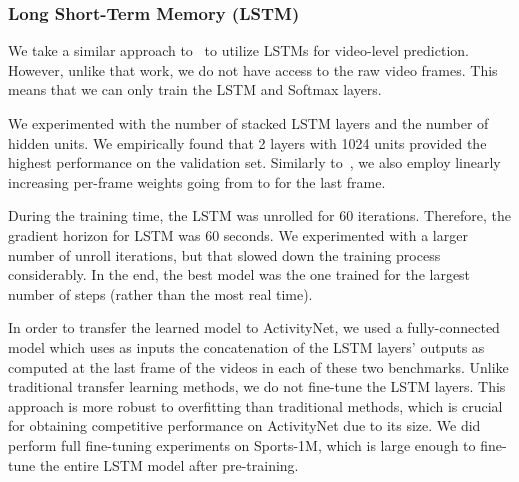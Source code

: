 \documentclass{sig-alternate-05-2015}
\begin{document}
\subsubsection{Long Short-Term Memory (LSTM)}
\label{sec:lstm}
We take a similar approach to~\cite{beyond} to utilize LSTMs for video-level prediction. However, unlike that work, we do not have access to the raw video frames. This means that we can only train the LSTM and Softmax layers.

  We experimented with the number of stacked LSTM layers and the number of hidden units. We empirically found that 2 layers with 1024 units provided the highest performance on the validation set. Similarly to~\cite{beyond}, we also employ linearly increasing per-frame weights going from  to  for the last frame.

  During the training time, the LSTM was unrolled for 60 iterations. Therefore, the gradient horizon for LSTM was 60 seconds. We experimented with a larger number of unroll iterations, but that slowed down the training process considerably. In the end, the best model was the one trained for the largest number of steps (rather than the most real time).

  In order to transfer the learned model to ActivityNet, we used a fully-connected
  model which uses as inputs the concatenation of the LSTM layers' outputs as
  computed at the last frame of the videos in each of these two benchmarks.
  Unlike traditional transfer learning methods, we do not fine-tune the LSTM
  layers. This approach is more robust to overfitting than traditional methods,
  which is crucial for obtaining competitive performance on ActivityNet due to
  its size. We did perform full fine-tuning experiments on Sports-1M, which is
  large enough to fine-tune the entire LSTM model after pre-training.
  
\end{document}

